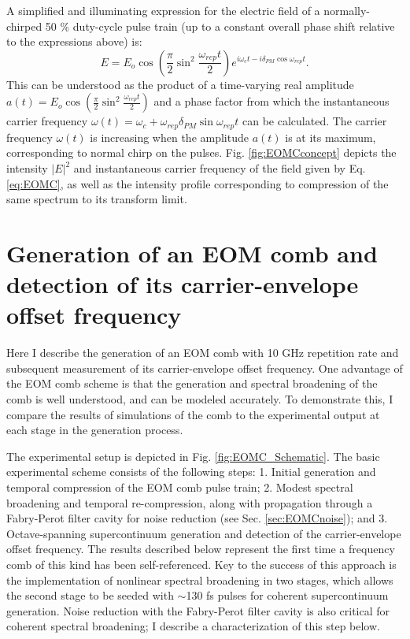 A simplified and illuminating expression for the electric field of a normally-chirped 50 $\%$ duty-cycle pulse train (up to a constant overall phase shift relative to the expressions above) is:
\begin{equation}
E=E_o\cos\left(\frac{\pi}{2}\sin^2{\frac{\omega_{rep}t}{2}}\right)e^{i\omega_ct-i\delta_{PM}\cos{\omega_{rep}t}}. \label{eq:EOMC}
\end{equation}
This can be understood as the product of a time-varying real amplitude $a(t)=E_o\cos\left(\frac{\pi}{2}\sin^2{\frac{\omega_{rep}t}{2}}\right)$ and a phase factor from which the instantaneous carrier frequency $\omega(t)=\omega_c+\omega_{rep}\delta_{PM}\sin{\omega_{rep}t}$ can be calculated. The carrier frequency $\omega(t)$ is increasing when the amplitude $a(t)$ is at its maximum, corresponding to normal chirp on the pulses. Fig. \ref{fig:EOMCconcept} depicts the intensity $|E|^2$ and instantaneous carrier frequency of the field given by Eq. \ref{eq:EOMC}, as well as the intensity profile corresponding to compression of the same spectrum to its transform limit.




\section{Generation of an EOM comb and detection of its carrier-envelope offset frequency}

Here I describe the generation of an EOM comb with 10 GHz repetition rate and subsequent measurement of its carrier-envelope offset frequency. One advantage of the EOM comb scheme is that the generation and spectral broadening of the comb is well understood, and can be modeled accurately. To demonstrate this, I compare the results of simulations of the comb to the experimental output at each stage in the generation process.

The experimental setup is depicted in Fig. \ref{fig:EOMC_Schematic}. The basic experimental scheme consists of the following steps: 1. Initial generation and temporal compression of the EOM comb pulse train; 2. Modest spectral broadening and temporal re-compression, along with propagation through a Fabry-Perot filter cavity for noise reduction (see Sec. \ref{sec:EOMCnoise}); and 3. Octave-spanning supercontinuum generation and detection of the carrier-envelope offset frequency. The results described below represent the first time a frequency comb of this kind has been self-referenced. Key to the success of this approach is the implementation of nonlinear spectral broadening in two stages, which allows the second stage to be seeded with $\sim$130 fs pulses for coherent supercontinuum generation. Noise reduction with the Fabry-Perot filter cavity is also critical for coherent spectral broadening; I describe a characterization of this step below.

